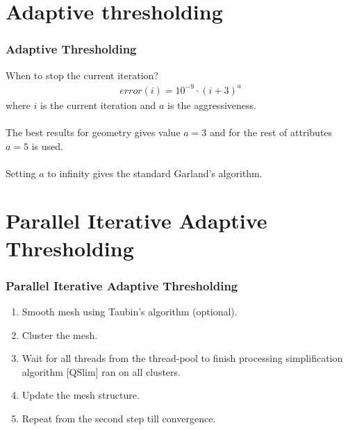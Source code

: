 \documentclass[
	10pt,
	t		%
]{beamer}
\begin{document}
\section{Adaptive thresholding}
\begin{frame}
\frametitle{Adaptive Thresholding}
When to stop the current iteration?
\centering
\begin{align}
error(i)=10^{-9}\cdot(i+3)^a
\label{error_formula}
\end{align}
where $i$ is the current iteration and $a$ is the aggressiveness.\\~\\
The best results for geometry gives value $a=3$ and for the rest of attributes $a=5$ is used.\\~\\
Setting $a$ to infinity gives the standard Garland's algorithm.
\end{frame}

\section{Parallel Iterative Adaptive Thresholding}
\begin{frame}
\frametitle{Parallel Iterative Adaptive Thresholding}
\centering
\begin{enumerate}
\item Smooth mesh using Taubin's algorithm (optional).
\item Cluster the mesh.
\item Wait for all threads from the thread-pool to finish processing simplification algorithm [QSlim] ran on all clusters.
\item Update the mesh structure.
\item Repeat from the second step till convergence.
\end{enumerate}
\end{frame}
\end{document}
